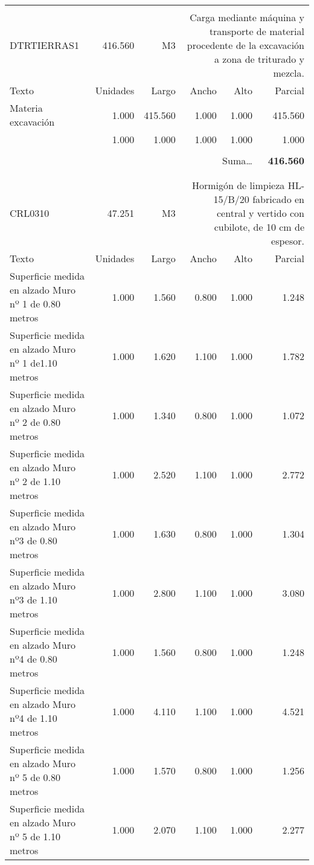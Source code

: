 \documentclass{book}%
\begin{document}
\begin{longtable}{lrrrrr}
&&&&&\\%
DTRTIERRAS1&416.560& M3&\multicolumn{3}{p{6cm}}{\scriptsize Carga mediante máquina y transporte de material procedente de la excavación a zona de triturado y mezcla.\normalsize}\\%
Texto&Unidades&Largo&Ancho&Alto&Parcial\\%
\hline%
\multicolumn{1}{p{3.5cm}}{Materia excavación}&1.000&415.560&1.000&1.000&415.560\\%
\multicolumn{1}{p{3.5cm}}{}&1.000&1.000&1.000&1.000&1.000\\%
&&&&&\\%
\multicolumn{5}{r}{Suma\ldots}&\textbf{416.560}\\%
\hline%
&&&&&\\%
&&&&&\\%
CRL0310&47.251& M3&\multicolumn{3}{p{6cm}}{\scriptsize Hormigón de limpieza HL-15/B/20 fabricado en central y vertido con cubilote, de 10 cm de espesor.\normalsize}\\%
Texto&Unidades&Largo&Ancho&Alto&Parcial\\%
\hline%
\multicolumn{1}{p{3.5cm}}{Superficie medida en alzado Muro nº 1 de 0.80 metros }&1.000&1.560&0.800&1.000&1.248\\%
\multicolumn{1}{p{3.5cm}}{Superficie medida en alzado Muro nº 1 de1.10 metros }&1.000&1.620&1.100&1.000&1.782\\%
\multicolumn{1}{p{3.5cm}}{Superficie medida en alzado Muro nº 2 de 0.80 metros }&1.000&1.340&0.800&1.000&1.072\\%
\multicolumn{1}{p{3.5cm}}{Superficie medida en alzado Muro nº 2 de 1.10 metros }&1.000&2.520&1.100&1.000&2.772\\%
\multicolumn{1}{p{3.5cm}}{Superficie medida en alzado Muro nº3 de 0.80 metros }&1.000&1.630&0.800&1.000&1.304\\%
\multicolumn{1}{p{3.5cm}}{Superficie medida en alzado Muro nº3 de 1.10 metros }&1.000&2.800&1.100&1.000&3.080\\%
\multicolumn{1}{p{3.5cm}}{Superficie medida en alzado Muro nº4 de 0.80 metros }&1.000&1.560&0.800&1.000&1.248\\%
\multicolumn{1}{p{3.5cm}}{Superficie medida en alzado Muro nº4 de 1.10 metros }&1.000&4.110&1.100&1.000&4.521\\%
\multicolumn{1}{p{3.5cm}}{Superficie medida en alzado Muro nº 5 de 0.80 metros }&1.000&1.570&0.800&1.000&1.256\\%
\multicolumn{1}{p{3.5cm}}{Superficie medida en alzado Muro nº 5 de 1.10 metros }&1.000&2.070&1.100&1.000&2.277\\%

\end{longtable}
\end{document}
